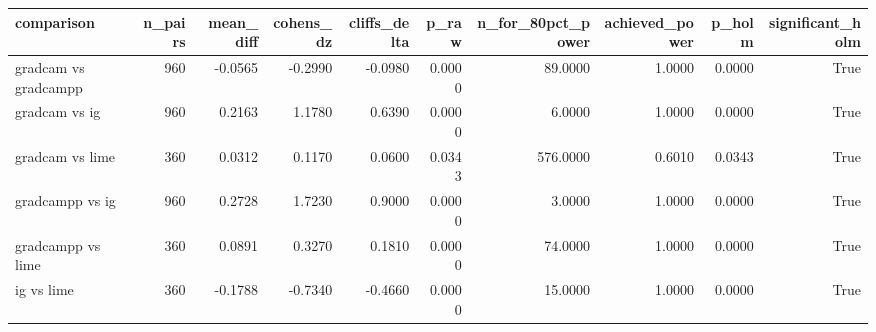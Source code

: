\begin{tabular}{lrrrrrrrrr}
\toprule
comparison & n\_pairs & mean\_diff & cohens\_dz & cliffs\_delta & p\_raw & n\_for\_80pct\_power & achieved\_power & p\_holm & significant\_holm \\
\midrule
gradcam vs gradcampp & 960 & -0.0565 & -0.2990 & -0.0980 & 0.0000 & 89.0000 & 1.0000 & 0.0000 & True \\
gradcam vs ig & 960 & 0.2163 & 1.1780 & 0.6390 & 0.0000 & 6.0000 & 1.0000 & 0.0000 & True \\
gradcam vs lime & 360 & 0.0312 & 0.1170 & 0.0600 & 0.0343 & 576.0000 & 0.6010 & 0.0343 & True \\
gradcampp vs ig & 960 & 0.2728 & 1.7230 & 0.9000 & 0.0000 & 3.0000 & 1.0000 & 0.0000 & True \\
gradcampp vs lime & 360 & 0.0891 & 0.3270 & 0.1810 & 0.0000 & 74.0000 & 1.0000 & 0.0000 & True \\
ig vs lime & 360 & -0.1788 & -0.7340 & -0.4660 & 0.0000 & 15.0000 & 1.0000 & 0.0000 & True \\
\bottomrule
\end{tabular}
